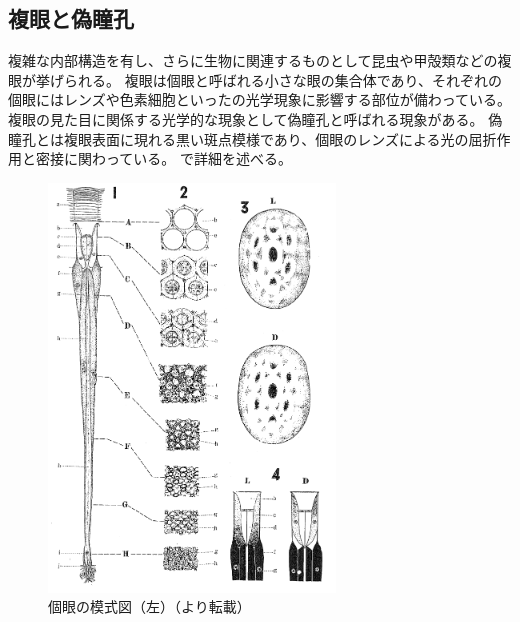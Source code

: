 


\subsection{複眼と偽瞳孔}
\label{SSCompoundeyeandpseudopupil}

複雑な内部構造を有し、さらに生物に関連するものとして昆虫や甲殻類などの複眼が挙げられる。
複眼は個眼と呼ばれる小さな眼の集合体であり、それぞれの個眼にはレンズや色素細胞といったの光学現象に影響する部位が備わっている。
複眼の見た目に関係する光学的な現象として偽瞳孔と呼ばれる現象がある。
偽瞳孔とは複眼表面に現れる黒い斑点模様であり、個眼のレンズによる光の屈折作用と密接に関わっている。
で詳細を述べる。

\begin{figure}[htbp]
  \centering
  \includegraphics[width=3.0in]{./img/yagi3-lens-pigment.png}
  \caption{個眼の模式図（左）（\cite{yagi1955studies}より転載）}
  \label{FYagi3LensPigment}
\end{figure}

